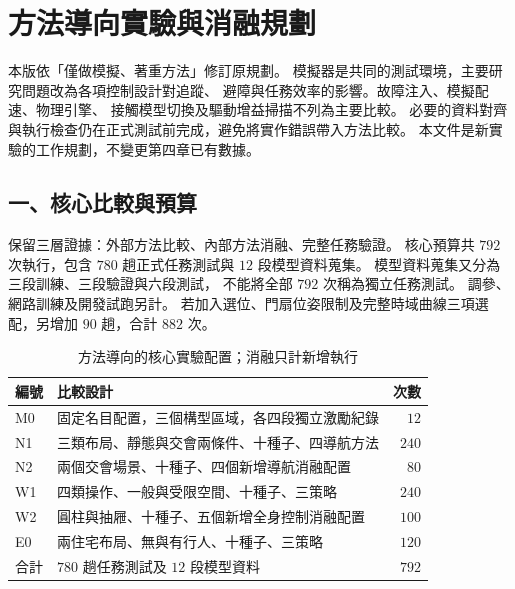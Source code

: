 
\section*{方法導向實驗與消融規劃}

本版依「僅做模擬、著重方法」修訂原規劃。
模擬器是共同的測試環境，主要研究問題改為各項控制設計對追蹤、
避障與任務效率的影響。故障注入、模擬配速、物理引擎、
接觸模型切換及驅動增益掃描不列為主要比較。
必要的資料對齊與執行檢查仍在正式測試前完成，避免將實作錯誤帶入方法比較。
本文件是新實驗的工作規劃，不變更第四章已有數據。

\subsection*{一、核心比較與預算}

保留三層證據：外部方法比較、內部方法消融、完整任務驗證。
核心預算共 $792$ 次執行，包含 $780$ 趟正式任務測試與 $12$ 段模型資料蒐集。
模型資料蒐集又分為三段訓練、三段驗證與六段測試，
不能將全部 $792$ 次稱為獨立任務測試。
調參、網路訓練及開發試跑另計。
若加入選位、門扇位姿限制及完整時域曲線三項選配，另增加 $90$ 趟，合計 $882$ 次。

\begin{table}[htbp]
    \centering
    \caption{方法導向的核心實驗配置；消融只計新增執行}
    \label{tab:method_focused_budget}
    \small
    \renewcommand{\arraystretch}{1.2}
    \begin{tabular}{l p{} r}
        \hline
        編號 & 比較設計 & 次數 \\
        \hline
        M0 & 固定名目配置，三個構型區域，各四段獨立激勵紀錄 & $12$ \\
        N1 & 三類布局、靜態與交會兩條件、十種子、四導航方法 & $240$ \\
        N2 & 兩個交會場景、十種子、四個新增導航消融配置 & $80$ \\
        W1 & 四類操作、一般與受限空間、十種子、三策略 & $240$ \\
        W2 & 圓柱與抽屜、十種子、五個新增全身控制消融配置 & $100$ \\
        E0 & 兩住宅布局、無與有行人、十種子、三策略 & $120$ \\
        \hline
        合計 & $780$ 趟任務測試及 $12$ 段模型資料 & $792$ \\
        \hline
    \end{tabular}
\end{table}

